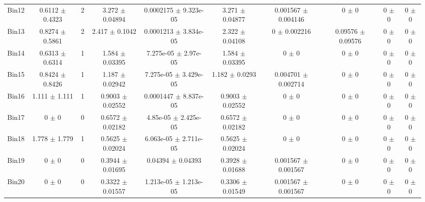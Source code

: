 \begin{tabular}{@{\extracolsep{4pt}}lccccccccc@{}}
     Bin12 & 0.6112 $\pm$ 0.4323 & 2 & 3.272 $\pm$ 0.04894 & 0.0002175 $\pm$ 9.323e-05 & 3.271 $\pm$ 0.04877 & 0.001567 $\pm$ 0.004146 & 0 $\pm$ 0 & 0 $\pm$ 0 & 0 $\pm$ 0 \\ 
     Bin13 & 0.8274 $\pm$ 0.5861 & 2 & 2.417 $\pm$ 0.1042 & 0.0001213 $\pm$ 3.834e-05 & 2.322 $\pm$ 0.04108 & 0 $\pm$ 0.002216 & 0.09576 $\pm$ 0.09576 & 0 $\pm$ 0 & 0 $\pm$ 0 \\ 
     Bin14 & 0.6313 $\pm$ 0.6314 & 1 & 1.584 $\pm$ 0.03395 & 7.275e-05 $\pm$ 2.97e-05 & 1.584 $\pm$ 0.03395 & 0 $\pm$ 0 & 0 $\pm$ 0 & 0 $\pm$ 0 & 0 $\pm$ 0 \\ 
     Bin15 & 0.8424 $\pm$ 0.8426 & 1 & 1.187 $\pm$ 0.02942 & 7.275e-05 $\pm$ 3.429e-05 & 1.182 $\pm$ 0.0293 & 0.004701 $\pm$ 0.002714 & 0 $\pm$ 0 & 0 $\pm$ 0 & 0 $\pm$ 0 \\ 
     Bin16 & 1.111 $\pm$ 1.111 & 1 & 0.9003 $\pm$ 0.02552 & 0.0001447 $\pm$ 8.837e-05 & 0.9003 $\pm$ 0.02552 & 0 $\pm$ 0 & 0 $\pm$ 0 & 0 $\pm$ 0 & 0 $\pm$ 0 \\ 
     Bin17 & 0 $\pm$ 0 & 0 & 0.6572 $\pm$ 0.02182 & 4.85e-05 $\pm$ 2.425e-05 & 0.6572 $\pm$ 0.02182 & 0 $\pm$ 0 & 0 $\pm$ 0 & 0 $\pm$ 0 & 0 $\pm$ 0 \\ 
     Bin18 & 1.778 $\pm$ 1.779 & 1 & 0.5625 $\pm$ 0.02024 & 6.063e-05 $\pm$ 2.711e-05 & 0.5625 $\pm$ 0.02024 & 0 $\pm$ 0 & 0 $\pm$ 0 & 0 $\pm$ 0 & 0 $\pm$ 0 \\ 
     Bin19 & 0 $\pm$ 0 & 0 & 0.3944 $\pm$ 0.01695 & 0.04394 $\pm$ 0.04393 & 0.3928 $\pm$ 0.01688 & 0.001567 $\pm$ 0.001567 & 0 $\pm$ 0 & 0 $\pm$ 0 & 0 $\pm$ 0 \\ 
     Bin20 & 0 $\pm$ 0 & 0 & 0.3322 $\pm$ 0.01557 & 1.213e-05 $\pm$ 1.213e-05 & 0.3306 $\pm$ 0.01549 & 0.001567 $\pm$ 0.001567 & 0 $\pm$ 0 & 0 $\pm$ 0 & 0 $\pm$ 0 \\ 
\hline\hline
  \end{tabular}
